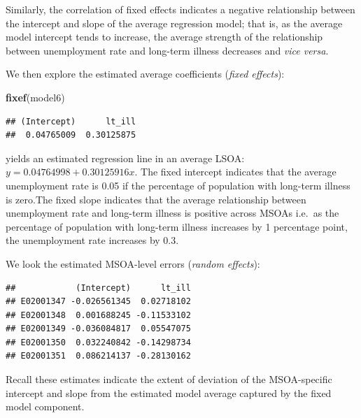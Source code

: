 \documentclass[
]{book}
\newenvironment{Shaded}{\begin{snugshade}}{\end{snugshade}}
\newcommand{\DecValTok}[1]{\textcolor[rgb]{0.00,0.00,0.81}{#1}}
\newcommand{\KeywordTok}[1]{\textcolor[rgb]{0.13,0.29,0.53}{\textbf{#1}}}
\newcommand{\NormalTok}[1]{#1}
\newcommand{\OperatorTok}[1]{\textcolor[rgb]{0.81,0.36,0.00}{\textbf{#1}}}
\newcommand{\StringTok}[1]{\textcolor[rgb]{0.31,0.60,0.02}{#1}}
\begin{document}
Similarly, the correlation of fixed effects indicates a negative relationship between the intercept and slope of the average regression model; that is, as the average model intercept tends to increase, the average strength of the relationship between unemployment rate and long-term illness decreases and \emph{vice versa}.

We then explore the estimated average coefficients (\emph{fixed effects}):

\begin{Shaded}
\begin{Highlighting}[]
\KeywordTok{fixef}\NormalTok{(model6)}
\end{Highlighting}
\end{Shaded}

\begin{verbatim}
## (Intercept)      lt_ill 
##  0.04765009  0.30125875
\end{verbatim}

yields an estimated regression line in an average LSOA: \(y = 0.04764998 + 0.30125916x\). The fixed intercept indicates that the average unemployment rate is 0.05 if the percentage of population with long-term illness is zero.The fixed slope indicates that the average relationship between unemployment rate and long-term illness is positive across MSOAs i.e.~as the percentage of population with long-term illness increases by 1 percentage point, the unemployment rate increases by 0.3.

We look the estimated MSOA-level errors (\emph{random effects}):

\begin{Shaded}
\end{Shaded}

\begin{verbatim}
##            (Intercept)      lt_ill
## E02001347 -0.026561345  0.02718102
## E02001348  0.001688245 -0.11533102
## E02001349 -0.036084817  0.05547075
## E02001350  0.032240842 -0.14298734
## E02001351  0.086214137 -0.28130162
\end{verbatim}

Recall these estimates indicate the extent of deviation of the MSOA-specific intercept and slope from the estimated model average captured by the fixed model component.
\end{document}
